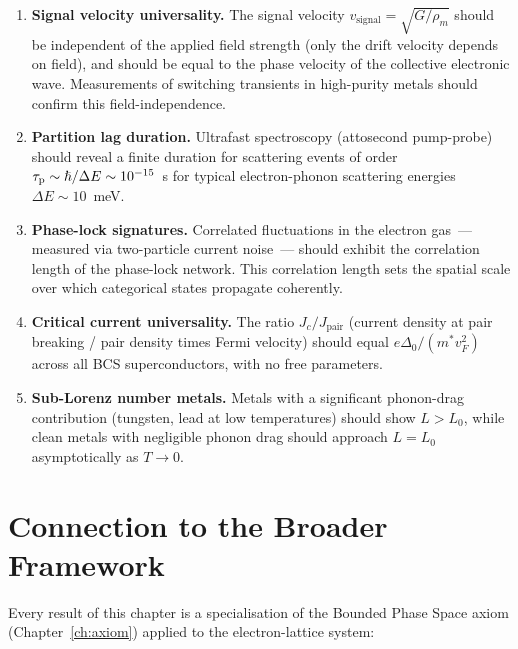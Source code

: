\begin{enumerate}
  \item \textbf{Signal velocity universality.} The signal velocity
    $v_{\mathrm{signal}} = \sqrt{G/\rho_m}$ should be independent of the
    applied field strength (only the drift velocity depends on field), and
    should be equal to the phase velocity of the collective electronic
    wave.  Measurements of switching transients in high-purity metals
    should confirm this field-independence.

  \item \textbf{Partition lag duration.} Ultrafast spectroscopy (attosecond
    pump-probe) should reveal a finite duration for scattering events of
    order $\tau_{\mathrm{p}} \sim \hslash/\Delta E \sim 10^{-15}$~s for typical
    electron-phonon scattering energies $\Delta E \sim 10$~meV.

  \item \textbf{Phase-lock signatures.} Correlated fluctuations in the
    electron gas~--- measured via two-particle current noise~--- should
    exhibit the correlation length of the phase-lock network.  This
    correlation length sets the spatial scale over which categorical states
    propagate coherently.

  \item \textbf{Critical current universality.} The ratio $J_c/J_{\mathrm{pair}}$
    (current density at pair breaking / pair density times Fermi velocity)
    should equal $e\Delta_0/(m^* v_F^2)$ across all BCS superconductors,
    with no free parameters.

  \item \textbf{Sub-Lorenz number metals.} Metals with a significant phonon-drag
    contribution (tungsten, lead at low temperatures) should show $L > L_0$,
    while clean metals with negligible phonon drag should approach
    $L = L_0$ asymptotically as $T \to 0$.
\end{enumerate}

\section{Connection to the Broader Framework}
\label{sec:ch18-connections}

Every result of this chapter is a specialisation of the Bounded Phase Space
axiom (Chapter~\ref{ch:axiom}) applied to the electron-lattice system:


